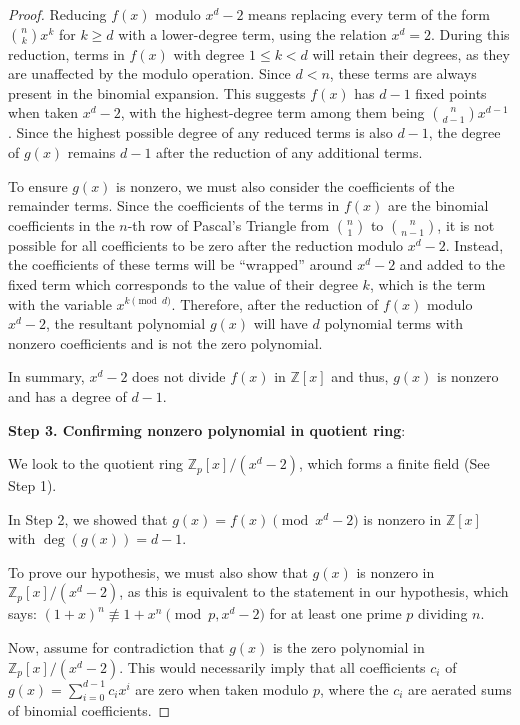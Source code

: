 \documentclass{article}
\theoremstyle{plain}
\theoremstyle{definition}
\begin{document}
\begin{proof}
Reducing $f(x)$ modulo $x^d - 2$ means replacing every term of the form $\binom{n}{k} x^k$ for $k \geq d$ with a lower-degree term, using the relation $x^d = 2$. During this reduction, terms in $f(x)$ with degree $1 \leq k < d$ will retain their degrees, as they are unaffected by the modulo operation. Since $d < n$, these terms are always present in the binomial expansion. This suggests $f(x)$ has $d-1$ fixed points when taken $x^d - 2$,  with the highest-degree term among them being $\binom{n}{d-1} x^{d-1}$. Since the highest possible degree of any reduced terms is also $d-1$, the degree of $g(x)$ remains $d-1$ after the reduction of any additional terms.

To ensure $g(x)$ is nonzero, we must also consider the coefficients of the remainder terms. Since the coefficients of the terms in $f(x)$ are the binomial coefficients in the $n$-th row of Pascal's Triangle from $\binom{n}{1}$ to $\binom{n}{n-1}$, it is not possible for all coefficients to be zero after the reduction modulo $x^d - 2$. Instead, the coefficients of these terms will be ``wrapped'' around $x^d - 2$ and added to the fixed term which corresponds to the value of their degree $k$, which is the term with the variable $x^{k \pmod{d}}$. Therefore, after the reduction of $f(x)$ modulo $x^d - 2$, the resultant polynomial $g(x)$ will have $d$ polynomial terms with nonzero coefficients and is not the zero polynomial.

In summary, $x^d-2$ does not divide $f(x)$ in $\mathbb{Z}[x]$ and thus, $g(x)$ is nonzero and has a degree of $d-1$.

\textbf{Step 3. Confirming nonzero polynomial in quotient ring}:

We look to the quotient ring $\mathbb{Z}_p[x]/(x^d - 2)$, which forms a finite field (See Step 1).

In Step 2, we showed that $g(x) = f(x) \pmod{x^d-2}$ is nonzero in $\mathbb{Z}[x]$ with $\deg(g(x)) = d-1$.

To prove our hypothesis, we must also show that $g(x)$ is nonzero in $\mathbb{Z}_p[x]/(x^d - 2)$, as this is equivalent to the statement in our hypothesis, which says: $(1 + x)^n \not\equiv 1 + x^n \pmod{p, x^d-2}$ for at least one prime $p$ dividing $n$.

Now, assume for contradiction that $g(x)$ is the zero polynomial in $\mathbb{Z}_p[x]/(x^d - 2)$. This would necessarily imply that all coefficients $c_i$ of $g(x) = \sum_{i=0}^{d-1} c_i x^i$ are zero when taken modulo $p$, where the $c_i$ are aerated sums of binomial coefficients.


\end{proof}
\end{document}
